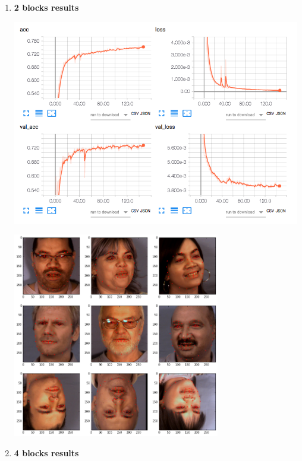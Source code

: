 \documentclass[11pt]{article}
\begin{document}
\pagebreak

\begin{enumerate}
\item \textbf{2 blocks results}
\label{sec:orge4022a3}

\centerline{\includegraphics[height=9cm]{./images/incep249Loss.png}}
\centerline{\includegraphics[height=9cm]{./images/incep249res.png}}

\pagebreak

\item \textbf{4 blocks results}
\label{sec:orgfd2fa35}


\end{enumerate}
\end{document}
